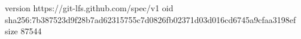 version https://git-lfs.github.com/spec/v1
oid sha256:7b387523d9f28b7ad62315755c7d0826fb02371d03d016cd6745a9cfaa3198ef
size 87544
